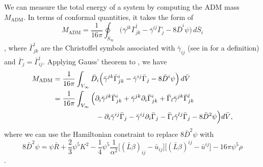\documentclass{../document}
\begin{document}
      We can measure the total energy of a system by computing the ADM mass $M_\text{ADM}$. In terms of conformal quantities, it takes the form of
      \begin{equation} \label{eq:Madm-surf}
        M_\text{ADM}
        = \frac{1}{16\pi} \oint_{S_\infty}  \Big(
          \bar\gamma^{jk} \bar\Gamma^i_{jk}
          - \bar\gamma^{ij} \bar\Gamma_{j}
          - 8 \bar D^i \psi
          \Big) \, d\bar{S}_i
      \end{equation}
      \cite[]{BaumgarteShapiro}, where $\bar\Gamma^i_{jk}$ are the Christoffel symbols associated with $\bar\gamma_{ij}$ (see  in \cite{BaumgarteShapiro} for a definition) and $\bar\Gamma_{j} = \bar\Gamma^{i}_{ij}$. Applying Gauss' theorem to \eq{\eqref{eq:Madm-surf}}, we have
      \begin{align}
        M_\text{ADM}
        &= \frac{1}{16\pi}
            \int_{V_\infty} \bar D_i  \Big(
              \bar\gamma^{jk} \bar\Gamma^i_{jk}
              - \bar\gamma^{ij} \bar\Gamma_{j}
              - 8 \bar D^i \psi
            \Big) \, d\bar{V} \label{eq:Madm-Gauss} \\
        &= \frac{1}{16\pi}
            \int_{V_\infty} \Big(
              \partial_i \bar\gamma^{jk} \bar\Gamma^i_{jk}
              + \bar\gamma^{jk} \partial_i \bar\Gamma^i_{jk}
              + \bar\Gamma_l \bar\gamma^{jk} \bar\Gamma^l_{jk}
              \\ &\qquad\qquad\qquad \notag
              - \partial_i \bar\gamma^{ij} \bar\Gamma_j
              - \bar\gamma^{ij} \partial_i \bar\Gamma_j
              - \bar\Gamma_l \bar\gamma^{lj} \bar\Gamma_j
              - 8 \bar D^2 \psi
            \Big) d\bar{V}, \label{eq:Madm-vol}
      \end{align}
      where we can use the Hamiltonian constraint to replace $8 \bar D^2 \psi$ with
      \begin{equation}
        8 \bar D^2 \psi = \psi \bar R + \frac{2}{3} \psi^5 K^2
                          - \frac{1}{4} \psi^5 \frac{1}{\alpha^2}
                              \Big[ (\bar L \beta)_{ij} - \bar u_{ij} \Big]
                              \Big[ (\bar L \beta)^{ij} - \bar u^{ij} \Big]
                          - 16\pi \psi^5 \rho
      \end{equation}
      \cite[]{BaumgarteShapiro}.
\end{document}
